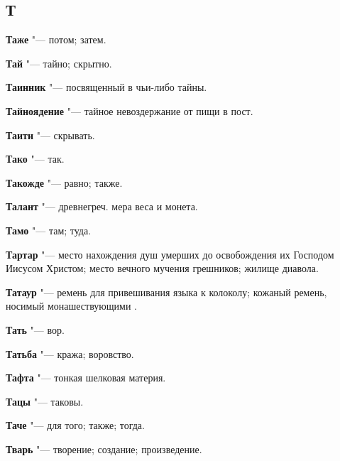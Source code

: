 \begin{mymulticols}{2}
\section{Т}





\noindent\textbf{Таже} "--- потом; затем. 




\noindent\textbf{Тай} "--- тайно; скрытно. 




\noindent\textbf{Таинник} "--- посвященный в чьи-либо тайны. 




\noindent\textbf{Тайноядение} "--- тайное невоздержание от пищи в пост. 




\noindent\textbf{Таити} "--- скрывать. 




\noindent\textbf{Тако} "--- так. 




\noindent\textbf{Такожде} "--- равно; также. 




\noindent\textbf{Талант} "--- древнегреч. мера веса и монета. 




\noindent\textbf{Тамо} "--- там; туда. 




\noindent\textbf{Тартар} "--- место нахождения душ умерших до освобождения их Господом Иисусом Христом; место вечного мучения грешников; жилище диавола. 




\noindent\textbf{Татаур} "--- ремень для привешивания языка к колоколу; кожаный ремень, носимый монашествующими . 




\noindent\textbf{Тать} "--- вор. 




\noindent\textbf{Татьба} "--- кража; воровство. 




\noindent\textbf{Тафта} "--- тонкая шелковая материя. 




\noindent\textbf{Тацы} "--- таковы. 




\noindent\textbf{Таче} "--- для того; также; тогда. 




\noindent\textbf{Тварь} "--- творение; создание; произведение. 





\end{mymulticols}
